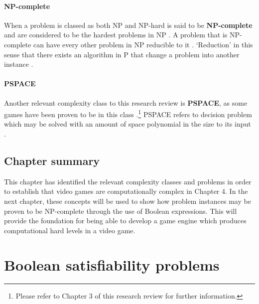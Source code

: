 \documentclass[11pt, a4paper, oneside]{report} %
\begin{document}
\subsubsection{NP-complete}

When a problem is classed as both NP and NP-hard is said to be \textbf{NP-complete} and are
considered to be the hardest problems in NP
\cite{sipser2012introduction,Goldreich:2008,kendall2008survey,du2011theory}. A problem that is NP-
complete can have every other problem in NP reducible to it \cite{papadimitriou2003computational}.
`Reduction' in this sense that there exists an algorithm in P that change a problem into another
instance \cite{du2011theory}.

\subsubsection{PSPACE} 

Another relevant complexity class to this research review is \textbf{PSPACE}, as some games have
been proven to be in this class \cite{DBLP:conf/fun/Forisek10, demaine2002push}.\footnote{Please
refer to Chapter 3 of this research review for further information.} PSPACE refers to decision
problem which may be solved with an amount of space polynomial in the size to its input
\cite{sipser2012introduction}.

\section{Chapter summary}

This chapter has identified the relevant complexity classes and problems in order to establish that
video games are computationally complex in Chapter 4. In the next chapter, these concepts will be
used to show how problem instances may be proven to be NP-complete through the use of Boolean
expressions. This will provide the foundation for being able to develop a game engine which produces
computational hard levels in a video game.



\chapter{Boolean satisfiability problems}
\end{document}
